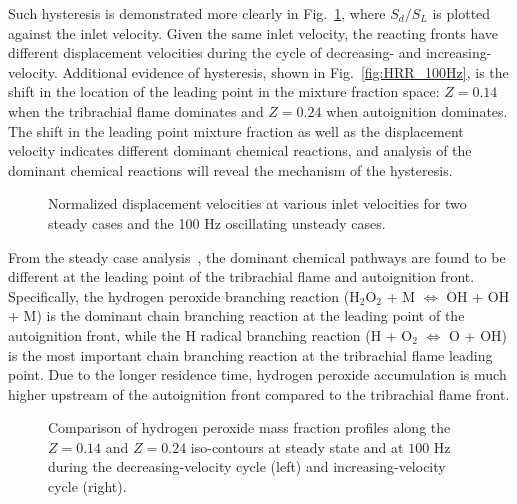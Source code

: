 \documentclass[review,3p,times]{elsarticle}
\begin{document}
Such hysteresis is demonstrated more clearly in Fig.~\ref{fig:sd_hys}, where $S_d/S_L$ is plotted against the inlet velocity.  Given the same inlet velocity, the reacting fronts have different displacement velocities during the cycle of decreasing- and increasing-velocity.  Additional evidence of hysteresis, shown in Fig.~\ref{fig:HRR_100Hz}, is the shift in the location of the leading point in the mixture fraction space: $Z = 0.14$ when the tribrachial flame dominates and $Z = 0.24$ when autoignition dominates.  The shift in the leading point mixture fraction as well as the displacement velocity indicates different dominant chemical reactions, and analysis of the dominant chemical reactions will reveal the mechanism of the hysteresis.

\begin{figure}[t]
  \centering
  \scriptsize
  \resizebox{0.5\textwidth}{!}{}
  \normalsize
  \vspace{-0.2in}
  \caption{\textcolor{Rev1}{Normalized displacement velocities at various inlet velocities for two steady cases and the 100 Hz oscillating unsteady cases.}}
  \label{fig:sd_hys}
\end{figure}

From the steady case analysis~\cite{deng15b}, the dominant chemical pathways are found to be different at the leading point of the tribrachial flame and autoignition front.  Specifically, the hydrogen peroxide branching reaction (H$_2$O$_2$ + M $\Longleftrightarrow$ OH + OH + M) is the dominant chain branching reaction at the leading point of the autoignition front, while the H radical branching reaction (H + O$_2$ $\Longleftrightarrow$ O + OH) is the most important chain branching reaction at the tribrachial flame leading point.  Due to the longer residence time, hydrogen peroxide accumulation is much higher upstream of the autoignition front compared to the tribrachial flame front.  

\begin{figure}[t]
  \centering
  \scriptsize
  \resizebox{0.49\textwidth}{!}{}
  \resizebox{0.49\textwidth}{!}{}
    \resizebox{0.49\textwidth}{!}{}
  \resizebox{0.49\textwidth}{!}{}
  \vspace{-0.2in}
  \normalsize
  \caption{\textcolor{Rev1}{Comparison of hydrogen peroxide mass fraction profiles along the $Z = 0.14$ and $Z = 0.24$ iso-contours at steady state and at $100$ Hz during the decreasing-velocity cycle (left) and increasing-velocity cycle (right).}}
  \label{fig:H2O2_updown}
\end{figure}
\end{document}
